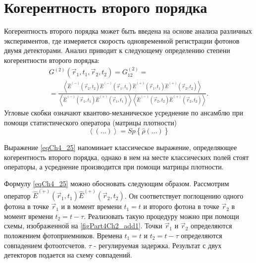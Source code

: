 \section{Когерентность второго порядка}
Когерентность второго порядка может быть введена на основе анализа
различных экспериментов, где измеряется скорость одновременной
регистрации фотонов двумя детекторами. Анализ приводит к
следующему определению степени когерентности второго порядка: 
\begin{eqnarray}
G^{(2)}\left(\vec{r}_1, t_1, \vec{r}_2, t_2\right) = 
G^{(2)}_{12} = 
\nonumber \\
=
\frac{\left<
\hat{E}^{(-)}\left(\vec{r}_2, t_2\right)
\hat{E}^{(-)}\left(\vec{r}_1, t_1\right)
\hat{E}^{(+)}\left(\vec{r}_1, t_1\right)
\hat{E}^{(+)}\left(\vec{r}_2, t_2\right)
\right>}
{\left<
\hat{E}^{(-)}\left(\vec{r}_1, t_1\right)
\hat{E}^{(+)}\left(\vec{r}_1, t_1\right)
\right>
\left<
\hat{E}^{(-)}\left(\vec{r}_2, t_2\right)
\hat{E}^{(+)}\left(\vec{r}_2, t_2\right)
\right>
}.
\label{eqCh4_25}
\end{eqnarray}
Угловые скобки означают квантово-механическое усреднение по ансамблю
при помощи статистического оператора (матрицы плотности) 
\[
\left<\left(\dots\right)\right> = Sp\left\{\hat{\rho}\left(\dots\right)\right\}
\]

Выражение \eqref{eqCh4_25} напоминает классическое выражение,
определяющее когерентность второго порядка, однако в нем на месте
классических полей стоят операторы, а усреднение производится при
помощи матрицы плотности. 



Формулу \eqref{eqCh4_25} можно обосновать следующим
образом. Рассмотрим оператор 
$\hat{E}^{(+)}\left(\vec{r}_1, t_1\right)\hat{E}^{(+)}\left(\vec{r}_2,
t_2\right)$. Он соответствует поглощению одного фотона в точке
$\vec{r}_1$ и в момент времени $t_1 = t$ и второго фотона в точке
$\vec{r}_2$ в момент времени $t_2 = t - \tau$. Реализовать такую
процедуру можно при помощи схемы, изображенной на
\autoref{figPart4Ch2_add1}. Точки  $\vec{r}_1$ и $\vec{r}_2$
определяются положением фотоприемников. Времена $t_1 = t$ и $t_2 = t -
\tau$ определяются совпадением фотоотсчетов. $\tau$ - регулируемая
задержка. Результат с двух детекторов подается на схему совпадений. 

